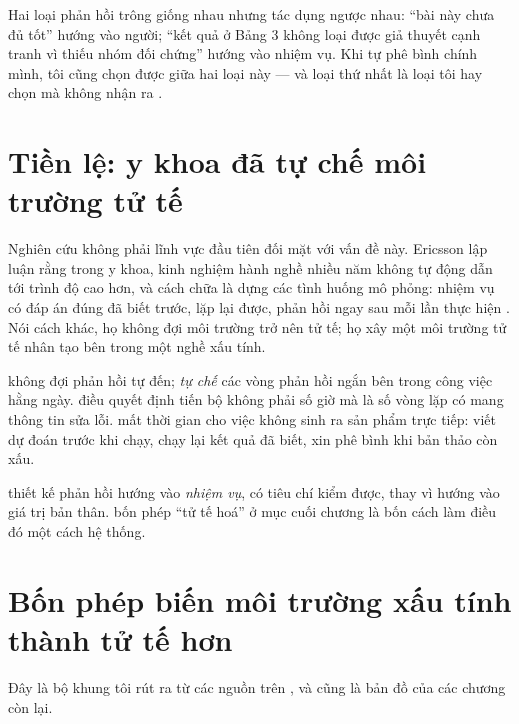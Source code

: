 \documentclass[../hieu-suat.tex]{subfiles}
\begin{document}
\begin{cambay}
Hai loại phản hồi trông giống nhau nhưng tác dụng ngược nhau: ``bài này chưa đủ tốt'' hướng vào người; ``kết quả ở Bảng 3 không loại được giả thuyết cạnh tranh vì thiếu nhóm đối chứng'' hướng vào nhiệm vụ. Khi tự phê bình chính mình, tôi cũng chọn được giữa hai loại này --- và loại thứ nhất là loại tôi hay chọn mà không nhận ra \nM{}.
\end{cambay}

\section{Tiền lệ: y khoa đã tự chế môi trường tử tế}

Nghiên cứu không phải lĩnh vực đầu tiên đối mặt với vấn đề này. Ericsson \cite{ericsson2004} lập luận rằng trong y khoa, kinh nghiệm hành nghề nhiều năm không tự động dẫn tới trình độ cao hơn, và cách chữa là dựng các tình huống mô phỏng: nhiệm vụ có đáp án đúng đã biết trước, lặp lại được, phản hồi ngay sau mỗi lần thực hiện \nT{}. Nói cách khác, họ không đợi môi trường trở nên tử tế; họ xây một môi trường tử tế nhân tạo bên trong một nghề xấu tính.

\begin{mach}
\item {} \gp không đợi phản hồi tự đến; \emph{tự chế} các vòng phản hồi ngắn bên trong công việc hằng ngày. \gd điều quyết định tiến bộ không phải số giờ mà là số vòng lặp có mang thông tin sửa lỗi. \gia mất thời gian cho việc không sinh ra sản phẩm trực tiếp: viết dự đoán trước khi chạy, chạy lại kết quả đã biết, xin phê bình khi bản thảo còn xấu.
\item {} \gp thiết kế phản hồi hướng vào \emph{nhiệm vụ}, có tiêu chí kiểm được, thay vì hướng vào giá trị bản thân. \hq bốn phép ``tử tế hoá'' ở mục cuối chương là bốn cách làm điều đó một cách hệ thống.
\end{mach}

\section{Bốn phép biến môi trường xấu tính thành tử tế hơn}

Đây là bộ khung tôi rút ra từ các nguồn trên \nM{}, và cũng là bản đồ của các chương còn lại.
\end{document}
